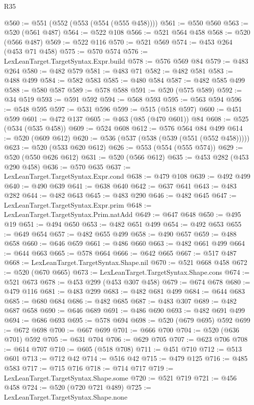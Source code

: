 \begin{lexlean}{R35}
\begin{coremodule}
@560 := @551 (@552 (@553 (@554 (@555 @458))))
@561 := @550 @560
@563 := @520 (@561 @487)
@564 := @522 @108
@566 := @521 @564 @458
@568 := @520 (@566 @487)
@569 := @522 @116
@570 := @521 @569
@574 := @453 @264 (@453 @71 @458)
@575 := @570 @574
@576 := LexLeanTarget.TargetSyntax.Expr.build
@578 := @576 @569 @84
@579 := @483 @264
@580 := @482 @579
@581 := @483 @71
@582 := @482 @581
@583 := @488 @499
@584 := @582 @583
@585 := @480 @584
@587 := @482 @585 @499
@588 := @580 @587
@589 := @578 @588
@591 := @520 (@575 @589)
@592 := @34 @519
@593 := @591 @592
@594 := @568 @593
@595 := @563 @594
@596 := @548 @595
@597 := @531 @596
@599 := @515 (@518 @597)
@600 := @451 @599
@601 := @472 @137
@605 := @463 (@85 (@470 @601)) @84
@608 := @525 (@534 (@535 @458))
@609 := @524 @608
@612 := @576 @564 @84 @499
@614 := @520 (@609 @612)
@620 := @536 (@537 (@538 (@539 (@551 (@552 @458)))))
@623 := @520 (@533 @620 @612)
@626 := @553 (@554 (@555 @574))
@629 := @520 (@550 @626 @612)
@631 := @520 (@566 @612)
@635 := @453 @282 (@453 @290 @458)
@636 := @570 @635
@637 := LexLeanTarget.TargetSyntax.Expr.cond
@638 := @479 @108
@639 := @492 @499
@640 := @490 @639
@641 := @638 @640
@642 := @637 @641
@643 := @483 @282
@644 := @482 @643
@645 := @483 @290
@646 := @482 @645
@647 := LexLeanTarget.TargetSyntax.Expr.prim
@648 := LexLeanTarget.TargetSyntax.Prim.natAdd
@649 := @647 @648
@650 := @495 @19
@651 := @494 @650
@653 := @482 @651 @499
@654 := @492 @653
@655 := @649 @654
@657 := @482 @655 @499
@658 := @490 @657
@659 := @488 @658
@660 := @646 @659
@661 := @486 @660
@663 := @482 @661 @499
@664 := @644 @663
@665 := @578 @664
@666 := @642 @665
@667 := @517 @487
@668 := LexLeanTarget.TargetSyntax.Shape.nil
@670 := @521 @668 @458
@672 := @520 (@670 @665)
@673 := LexLeanTarget.TargetSyntax.Shape.cons
@674 := @521 @673
@678 := @453 @299 (@453 @307 @458)
@679 := @674 @678
@680 := @479 @116
@681 := @483 @299
@683 := @482 @681 @499
@684 := @644 @683
@685 := @680 @684
@686 := @482 @685
@687 := @483 @307
@689 := @482 @687 @658
@690 := @646 @689
@691 := @486 @690
@693 := @482 @691 @499
@694 := @686 @693
@695 := @578 @694
@698 := @520 (@679 @695) @592
@699 := @672 @698
@700 := @667 @699
@701 := @666 @700
@704 := @520 (@636 @701) @592
@705 := @631 @704
@706 := @629 @705
@707 := @623 @706
@708 := @614 @707
@710 := @605 (@518 @708)
@711 := @451 @710
@712 := @513 @601
@713 := @712 @42
@714 := @516 @42
@715 := @479 @125
@716 := @485 @583
@717 := @715 @716
@718 := @714 @717
@719 := LexLeanTarget.TargetSyntax.Shape.some
@720 := @521 @719
@721 := @456 @458
@724 := @520 (@720 @721 @489)
@725 := LexLeanTarget.TargetSyntax.Shape.none

\end{coremodule}
\end{lexlean}

